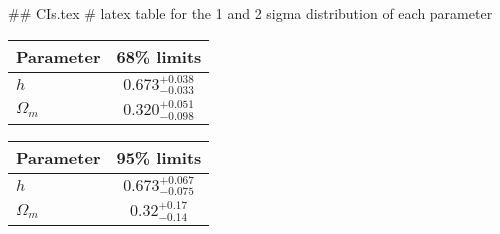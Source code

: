 ## CIs.tex
# latex table for the 1 and 2 sigma distribution of each parameter

\begin{tabular} { l  c}
 Parameter &  68\% limits\\
\hline
{\boldmath$h              $} & $0.673^{+0.038}_{-0.033}   $\\
{\boldmath$\Omega_m       $} & $0.320^{+0.051}_{-0.098}   $\\
\hline
\end{tabular}

\begin{tabular} { l  c}
 Parameter &  95\% limits\\
\hline
{\boldmath$h              $} & $0.673^{+0.067}_{-0.075}   $\\
{\boldmath$\Omega_m       $} & $0.32^{+0.17}_{-0.14}      $\\
\hline
\end{tabular}
